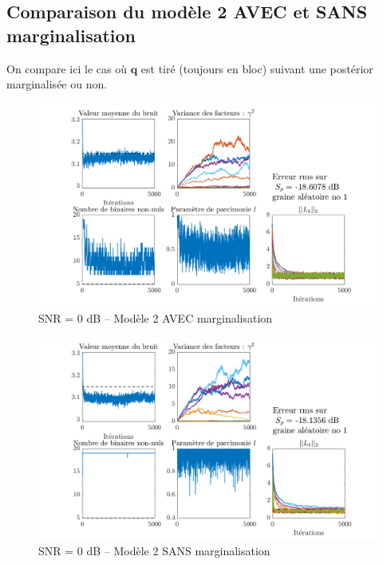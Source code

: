\documentclass[ 12pt]{article}
\begin{document}

\subsection{Comparaison du modèle 2 AVEC et SANS marginalisation}
On compare ici le cas où $\bm{q}$ est tiré (toujours en bloc) suivant une postérior marginalisée ou non.

\begin{figure}[H]
	\centering
	\includegraphics[width=\textwidth]{ToyCase/margon.png}
	\caption{SNR = 0 dB -- Modèle 2 AVEC marginalisation}
\end{figure}
\begin{figure}[H]
	\centering
	\includegraphics[width=\textwidth]{ToyCase/margoff.png}
	\caption{SNR = 0 dB -- Modèle 2 SANS marginalisation}
\end{figure}
\end{document}
